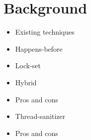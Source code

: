 \section{Background}
\label{sec:background}

\begin{itemize}
\item Existing techniques
\item Happens-before
\item Lock-set
\item Hybrid
\item Pros and cons
\item Thread-sanitizer
\item Pros and cons
\end{itemize}


